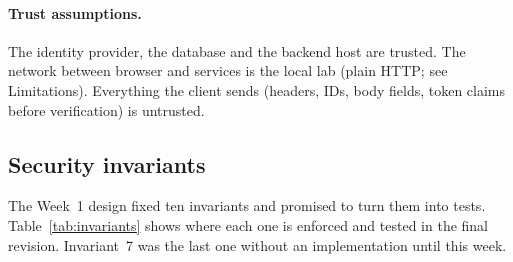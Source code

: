 \paragraph{Trust assumptions.} The identity provider, the database and the backend host are trusted. The network between browser and services is the local lab (plain HTTP; see Limitations). Everything the client sends (headers, IDs, body fields, token claims before verification) is untrusted.

\subsection{Security invariants}
The Week~1 design fixed ten invariants and promised to turn them into tests. Table~\ref{tab:invariants} shows where each one is enforced and tested in the final revision. Invariant~7 was the last one without an implementation until this week.

